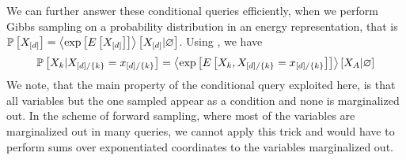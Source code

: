 We can further answer these conditional queries efficiently, when we perform Gibbs sampling on a probability distribution in an energy representation, that is $\mathbb{P}\left[X_{[d]}\right]=\left\langle \mathrm{exp}\left[E\left[X_{[d]}\right]\right]\right\rangle \left[ X_{[d]} | \varnothing \right]$.
Using , we have
\begin{align*}
    \mathbb{P}\left[X_{k}|X_{[d]/\{k\}}=x_{[d]/\{k\}}\right]
    = \left\langle \mathrm{exp}\left[E\left[X_{k},X_{[d]/\{k\}}=x_{[d]/\{k\}}\right]\right]
    \right\rangle \left[ X_{A} | \varnothing \right]
\end{align*}
We note, that the main property of the conditional query exploited here, is that all variables but the one sampled appear as a condition and none is marginalized out.
In the scheme of forward sampling, where most of the variables are marginalized out in many queries, we cannot apply this trick and would have to perform sums over exponentiated coordinates to the variables marginalized out.


\label{sec:simulatedAnnealing}

